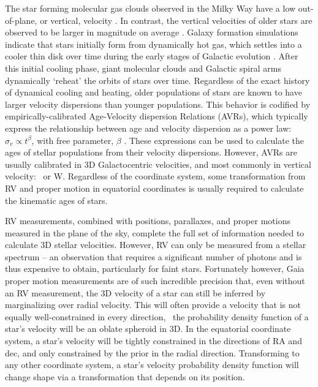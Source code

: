 The star forming molecular gas clouds observed in the Milky Way have a low
out-of-plane, or vertical, velocity \citep[\eg][]{stark1989, stark2005,
aumer2009, martig2014, aumer2016}.
In contrast, the vertical velocities of older stars are observed to be larger
in magnitude on average \citep{stromberg1946, wielen1977, nordstrom2004,
holmberg2007, holmberg2009, aumer2009, casagrande2011, ting2019, yu2018}.
Galaxy formation simulations indicate that stars initially form from
dynamically hot gas, which settles into a cooler thin disk over time during
the early stages of Galactic evolution .
After this initial cooling phase, giant molecular clouds and Galactic spiral
arms dynamically `reheat' the orbits of stars over time.
Regardless of the exact history of dynamical cooling and heating, older
populations of stars are known to have larger velocity dispersions than
younger populations.
This behavior is codified by empirically-calibrated Age-Velocity dispersion
Relations (AVRs), which typically express the relationship between age and
velocity dispersion as a power law: $\sigma_v \propto t^\beta$, with free
parameter, $\beta$ \citep[\eg][]{holmberg2009, yu2018, mackereth2019}.
These expressions can be used to calculate the ages of stellar populations
from their velocity dispersions.
However, AVRs are usually calibrated in 3D Galactocentric velocities, and most
commonly in vertical velocity: \vz\ or W.
Regardless of the coordinate system, some transformation from RV and proper
motion in equatorial coordinates is usually required to calculate the
kinematic ages of stars.

RV measurements, combined with positions, parallaxes, and proper motions
measured in the plane of the sky, complete the full set of information needed
to calculate 3D stellar velocities.
However, RV can only be measured from a stellar spectrum -- an observation
that requires a significant number of photons and is thus expensive to obtain,
particularly for faint stars.
Fortunately however, Gaia proper motion measurements are of such incredible
precision that, even without an RV measurement, the 3D velocity of a star can
still be inferred by marginalizing over radial velocity.
This will often provide a velocity that is not equally well-constrained in
every direction, \ie\ the probability density function of a star's velocity
will be an oblate spheroid in 3D.
In the equatorial coordinate system, a star's velocity will be tightly
constrained in the directions of RA and dec, and only constrained by
the prior in the radial direction.
Transforming to any other coordinate system, a star's velocity probability
density function will change shape via a transformation that depends on its
position.

